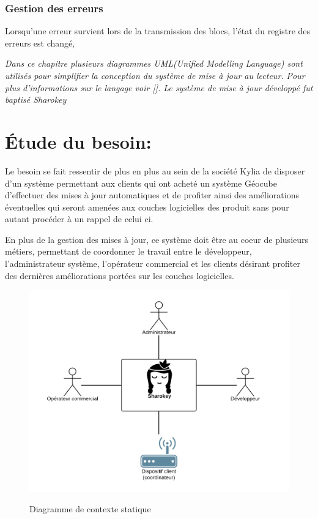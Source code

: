 \documentclass{themeensg}
\begin{document}
\subsubsection{Gestion des erreurs}
Lorsqu'une erreur survient lors de la transmission des blocs, l'état du registre des erreurs est changé, 

\textit{ Dans ce chapitre plusieurs diagrammes UML(Unified Modelling Language) sont utilisés pour simplifier la conception du système de mise à jour au lecteur. Pour plus d'informations sur le langage voir []. Le système de mise à jour développé fut baptisé Sharokey}
\section{Étude du besoin:}
Le besoin se fait ressentir de plus en plus au sein de la société Kylia de disposer d'un système permettant aux clients qui ont acheté un système Géocube  d'effectuer des mises à jour automatiques et de profiter ainsi des améliorations éventuelles qui seront amenées aux couches logicielles des produit sans pour autant procéder à un rappel de celui ci.

En plus de la gestion des mises à jour, ce système doit être au coeur de plusieurs métiers, permettant de coordonner le travail entre le développeur, l'administrateur système, l'opérateur commercial et les clients désirant profiter des dernières améliorations portées sur les couches logicielles.

\begin{figure}[h!]
\includegraphics[scale=0.9]{images/context_general.png}
\label{fig:context_statique}
\centering
\caption{Diagramme de contexte statique}
\end{figure}
\end{document}
